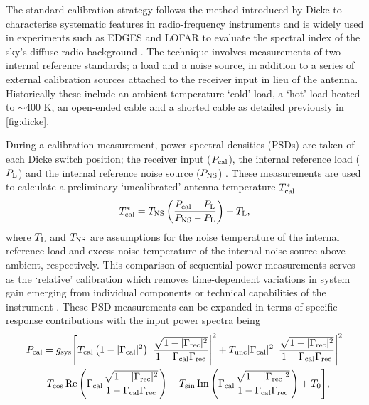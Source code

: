 The standard calibration strategy follows the method introduced by Dicke to characterise systematic features in radio-frequency instruments \citep{dickeplus} and is widely used in experiments such as EDGES \citep{edgesCal} and LOFAR \citep{lofarCal} to evaluate the spectral index of the sky's diffuse radio background \citep{rogersCal}. The technique involves measurements of two internal reference standards; a load and a noise source, in addition to a series of external calibration sources attached to the receiver input in lieu of the antenna. Historically these include an ambient-temperature ‘cold’ load, a ‘hot’ load heated to $\sim 400$ K, an open-ended cable and a shorted cable as detailed previously in \cref{fig:dicke}.

During a calibration measurement, power spectral densities (PSDs) are taken of each Dicke switch position; the receiver input ($P_{\mathrm{cal}}$), the internal reference load ($P_{\mathrm{L}}$) and the internal reference noise source ($P_{\mathrm{NS}}$) \citep{edgesCal}. These measurements are used to calculate a preliminary `uncalibrated' antenna temperature $T_{\mathrm{cal}}^*$
\begin{equation}
  \label{eqn:tantstar}
  T_{\mathrm{cal}}^* = T_{\mathrm{NS}} \left(\frac{P_{\mathrm{cal}}-P_{\mathrm{L}}}{P_{\mathrm{NS}}-P_{\mathrm{L}}}\right) + T_{\mathrm{L}},
\end{equation}
where $T_{\mathrm{L}}$ and $T_{\mathrm{NS}}$ are assumptions for the noise temperature of the internal reference load and excess noise temperature of the internal noise source above ambient, respectively. This comparison of sequential power measurements serves as the `relative' calibration which removes time-dependent variations in system gain emerging from individual components or technical capabilities of the instrument \citep{edgesCal}. These PSD measurements can be expanded in terms of specific response contributions with the input power spectra being
\begin{multline}
  \label{eqn:pant}
  P_{\mathrm{cal}} = g_{\mathrm{sys}} \Bigg[ T_{\mathrm{cal}}\left(1-|\Gamma_{\mathrm{cal}}|^2\right)\left|\frac{\sqrt{1 - |\Gamma_{\mathrm{rec}}|^2}}{1-\Gamma_{\mathrm{cal}}\Gamma_{\mathrm{rec}}}\right|^2 + T_{\mathrm{unc}}|\Gamma_{\mathrm{cal}}|^2\left|\frac{\sqrt{1 - |\Gamma_{\mathrm{rec}}|^2}}{1-\Gamma_{\mathrm{cal}}\Gamma_{\mathrm{rec}}}\right|^2 \\
  + T_{\mathrm{cos}}\operatorname{Re}\left(\Gamma_{\mathrm{cal}}\frac{\sqrt{1 - |\Gamma_{\mathrm{rec}}|^2}}{1-\Gamma_{\mathrm{cal}}\Gamma_{\mathrm{rec}}}\right) + T_{\mathrm{sin}}\operatorname{Im}\left(\Gamma_{\mathrm{cal}}\frac{\sqrt{1 - |\Gamma_{\mathrm{rec}}|^2}}{1-\Gamma_{\mathrm{cal}}\Gamma_{\mathrm{rec}}}\right) 
  + T_0 \Bigg],
\end{multline}

